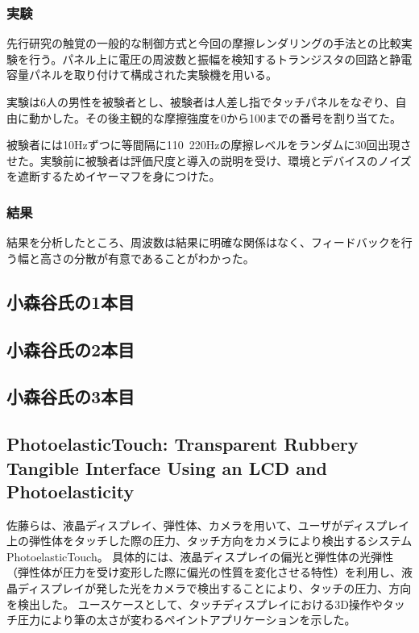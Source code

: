 \documentclass[11pt,a4paper]{jarticle}
\begin{document}
\subsubsection{実験}
先行研究の触覚の一般的な制御方式と今回の摩擦レンダリングの手法との比較実験を行う。パネル上に電圧の周波数と振幅を検知するトランジスタの回路と静電容量パネルを取り付けて構成された実験機を用いる。

実験は6人の男性を被験者とし、被験者は人差し指でタッチパネルをなぞり、自由に動かした。その後主観的な摩擦強度を0から100までの番号を割り当てた。

被験者には10Hzずつに等間隔に110~220Hzの摩擦レベルをランダムに30回出現させた。実験前に被験者は評価尺度と導入の説明を受け、環境とデバイスのノイズを遮断するためイヤーマフを身につけた。

\subsubsection{結果}
結果を分析したところ、周波数は結果に明確な関係はなく、フィードバックを行う幅と高さの分散が有意であることがわかった。

\subsection{小森谷氏の1本目}

\subsection{小森谷氏の2本目}

\subsection{小森谷氏の3本目}

\subsection{PhotoelasticTouch: Transparent Rubbery Tangible Interface Using an LCD and Photoelasticity\cite{Sato:2009}}
佐藤らは、液晶ディスプレイ、弾性体、カメラを用いて、ユーザがディスプレイ上の弾性体をタッチした際の圧力、タッチ方向をカメラにより検出するシステムPhotoelasticTouch。
具体的には、液晶ディスプレイの偏光と弾性体の光弾性（弾性体が圧力を受け変形した際に偏光の性質を変化させる特性）を利用し、液晶ディスプレイが発した光をカメラで検出することにより、タッチの圧力、方向を検出した。
ユースケースとして、タッチディスプレイにおける3D操作やタッチ圧力により筆の太さが変わるペイントアプリケーションを示した。
\end{document}
